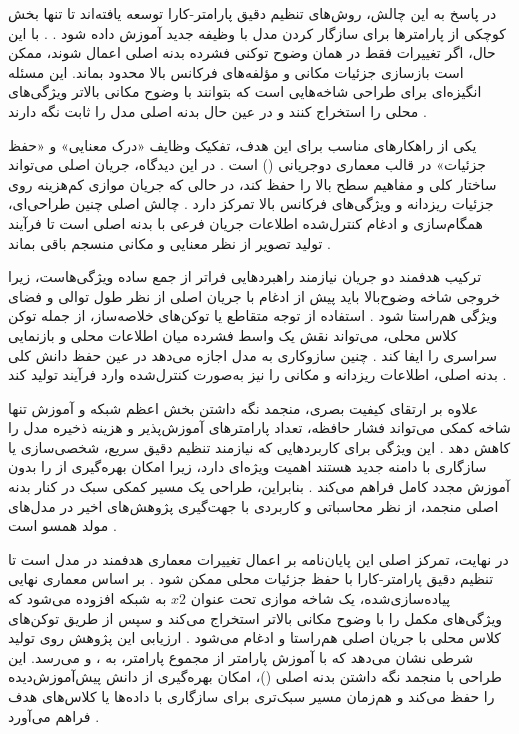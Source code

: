 در پاسخ به این چالش، روش‌های تنظیم دقیق پارامتر-کارا توسعه یافته‌اند تا تنها بخش کوچکی از پارامترها برای سازگار کردن مدل با وظیفه جدید آموزش داده شود \cite{2479204,8409325}.
. با این حال، اگر تغییرات فقط در همان وضوح توکنی فشرده بدنه اصلی اعمال شوند، ممکن است بازسازی جزئیات مکانی و مؤلفه‌های فرکانس بالا محدود بماند. این مسئله انگیزه‌ای برای طراحی شاخه‌هایی است که بتوانند با وضوح مکانی بالاتر ویژگی‌های محلی را استخراج کنند و در عین حال بدنه اصلی مدل را ثابت نگه دارند \cite{wang2020hrnet,chen2021crossvit}.

یکی از راهکارهای مناسب برای این هدف، تفکیک وظایف «درک معنایی» و «حفظ جزئیات» در قالب معماری دوجریانی () است \cite{wang2020hrnet,chen2021crossvit}. در این دیدگاه، جریان اصلی می‌تواند ساختار کلی و مفاهیم سطح بالا را حفظ کند، در حالی که جریان موازی کم‌هزینه روی جزئیات ریزدانه و ویژگی‌های فرکانس بالا تمرکز دارد \cite{wang2020hrnet}. چالش اصلی چنین طراحی‌ای، همگام‌سازی و ادغام کنترل‌شده اطلاعات جریان فرعی با بدنه اصلی است تا فرآیند تولید تصویر از نظر معنایی و مکانی منسجم باقی بماند \cite{chen2021crossvit,2209.12152}.

ترکیب هدفمند دو جریان نیازمند راهبردهایی فراتر از جمع ساده ویژگی‌هاست، زیرا خروجی شاخه وضوح‌بالا باید پیش از ادغام با جریان اصلی از نظر طول توالی و فضای ویژگی هم‌راستا شود \cite{chen2021crossvit,2209.12152}. استفاده از توجه متقاطع یا توکن‌های خلاصه‌ساز، از جمله توکن کلاس محلی، می‌تواند نقش یک واسط فشرده میان اطلاعات محلی و بازنمایی سراسری را ایفا کند \cite{Dosovitskiy2020,chen2021crossvit}. چنین سازوکاری به مدل اجازه می‌دهد در عین حفظ دانش کلی بدنه اصلی، اطلاعات ریزدانه و مکانی را نیز به‌صورت کنترل‌شده وارد فرآیند تولید کند \cite{2212.09748,2209.12152}.

علاوه بر ارتقای کیفیت بصری، منجمد نگه داشتن بخش اعظم شبکه و آموزش تنها شاخه کمکی می‌تواند فشار حافظه، تعداد پارامترهای آموزش‌پذیر و هزینه ذخیره مدل را کاهش دهد \cite{2479204,8409325}. این ویژگی برای کاربردهایی که نیازمند تنظیم دقیق سریع، شخصی‌سازی یا سازگاری با دامنه جدید هستند اهمیت ویژه‌ای دارد، زیرا امکان بهره‌گیری از  را بدون آموزش مجدد کامل فراهم می‌کند \cite{ryu2023loradiffusion,0052338,2755774}. بنابراین، طراحی یک مسیر کمکی سبک در کنار بدنه اصلی منجمد، از نظر محاسباتی و کاربردی با جهت‌گیری پژوهش‌های اخیر در مدل‌های مولد همسو است \cite{2212.09748,8409325}.

در نهایت، تمرکز اصلی این پایان‌نامه بر اعمال تغییرات معماری هدفمند در مدل  است تا تنظیم دقیق پارامتر-کارا با حفظ جزئیات محلی ممکن شود \cite{2212.09748,8409325}. بر اساس معماری نهایی پیاده‌سازی‌شده، یک شاخه موازی تحت عنوان $x2$ به شبکه افزوده می‌شود که ویژگی‌های مکمل را با وضوح مکانی بالاتر استخراج می‌کند و سپس از طریق توکن‌های کلاس محلی با جریان اصلی هم‌راستا و ادغام می‌شود \cite{chen2021crossvit,2088740}. ارزیابی این پژوهش روی تولید شرطی  نشان می‌دهد که  با آموزش  پارامتر از مجموع  پارامتر، به ،  و  می‌رسد. این طراحی با منجمد نگه داشتن بدنه اصلی ()، امکان بهره‌گیری از دانش پیش‌آموزش‌دیده را حفظ می‌کند و هم‌زمان مسیر سبک‌تری برای سازگاری با داده‌ها یا کلاس‌های هدف فراهم می‌آورد \cite{2212.09748,Pan2024FineDiffusion}.

